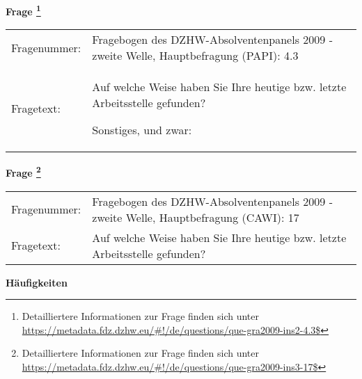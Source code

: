 				\vspace*{0.5cm}
                \noindent\textbf{Frage
	                \footnote{Detailliertere Informationen zur Frage finden sich unter
		              \url{https://metadata.fdz.dzhw.eu/\#!/de/questions/que-gra2009-ins2-4.3$}}}\\
				\begin{tabularx}{\hsize}{@{}lX}
					Fragenummer: &
					  Fragebogen des DZHW-Absolventenpanels 2009 - zweite Welle, Hauptbefragung (PAPI):
					  4.3
 \\
					Fragetext: & Auf welche Weise haben Sie Ihre heutige bzw. letzte Arbeitsstelle gefunden?\par  Sonstiges, und zwar: \\
				\end{tabularx}
				\vspace*{0.5cm}
                \noindent\textbf{Frage
	                \footnote{Detailliertere Informationen zur Frage finden sich unter
		              \url{https://metadata.fdz.dzhw.eu/\#!/de/questions/que-gra2009-ins3-17$}}}\\
				\begin{tabularx}{\hsize}{@{}lX}
					Fragenummer: &
					  Fragebogen des DZHW-Absolventenpanels 2009 - zweite Welle, Hauptbefragung (CAWI):
					  17
 \\
					Fragetext: & Auf welche Weise haben Sie Ihre heutige bzw. letzte Arbeitsstelle gefunden? \\
				\end{tabularx}





        		\vspace*{0.5cm}
                \noindent\textbf{Häufigkeiten}

